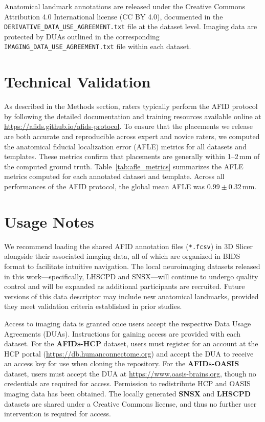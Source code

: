 Anatomical landmark annotations are released under the Creative Commons Attribution 4.0 International license (CC BY 4.0), documented in the \texttt{DERIVATIVE\_DATA\_USE\_AGREEMENT.txt} file at the dataset level. Imaging data are protected by DUAs outlined in the corresponding \texttt{IMAGING\_DATA\_USE\_AGREEMENT.txt} file within each dataset.


\section{Technical Validation}
As described in the Methods section, raters typically perform the AFID protocol by following the detailed documentation and training resources available online at \url{https://afids.github.io/afids-protocol}\cite{afidsprotocol}. To ensure that the placements we release are both accurate and reproducible across expert and novice raters, we computed the anatomical fiducial localization error (AFLE) metrics for all datasets and templates. These metrics confirm that placements are generally within 1–2\,mm of the computed ground truth.  Table~\ref{tab:afle_metrics} summarizes the AFLE metrics computed for each annotated dataset and template. Across all performances of the AFID protocol, the global mean AFLE was $0.99 \pm 0.32$\,mm.


\section{Usage Notes}
We recommend loading the shared AFID annotation files (\texttt{*.fcsv}) in 3D Slicer alongside their associated imaging data, all of which are organized in BIDS format to facilitate intuitive navigation. The local neuroimaging datasets released in this work—specifically, LHSCPD and SNSX—will continue to undergo quality control and will be expanded as additional participants are recruited. Future versions of this data descriptor may include new anatomical landmarks, provided they meet validation criteria established in prior studies\cite{afidvalidation1,afidvalidation2}.

Access to imaging data is granted once users accept the respective Data Usage Agreements (DUAs). Instructions for gaining access are provided with each dataset\cite{zenodo,openneuro1,openneuro2,openneuro3}. For the \textbf{AFIDs-HCP} dataset, users must register for an account at the HCP portal (\url{https://db.humanconnectome.org}) and accept the DUA to receive an access key for use when cloning the repository. For the \textbf{AFIDs-OASIS} dataset, users must accept the DUA at \url{https://www.oasis-brains.org}, though no credentials are required for access. Permission to redistribute HCP and OASIS imaging data has been obtained. The locally generated \textbf{SNSX}\cite{snsx} and \textbf{LHSCPD}\cite{lhscpd} datasets are shared under a Creative Commons license, and thus no further user intervention is required for access.


